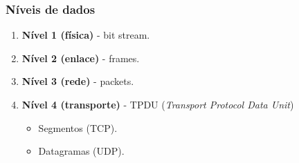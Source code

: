\documentclass[xcolor=dvipsnames,10pt,compress,aspectratio=169]{beamer}
\begin{document}
\begin{frame}
  \frametitle{Níveis de dados}
  \begin{enumerate}
  \item {\bf Nível 1 (física)} - bit stream.
  \item {\bf Nível 2 (enlace)} - frames.
  \item {\bf Nível 3 (rede)} - packets.
  \item {\bf Nível 4 (transporte)} - TPDU (\emph{Transport Protocol Data Unit})
    \begin{itemize}
    \item Segmentos (TCP).
    \item Datagramas (UDP).
    \end{itemize}
  \end{enumerate}
\end{frame}
\end{document}
